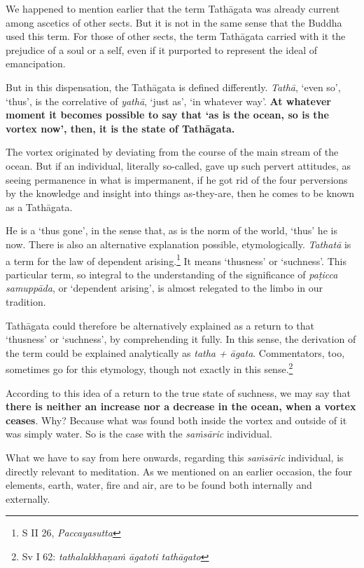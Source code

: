 We happened to mention earlier that the term Tathāgata was already current among ascetics of other sects. But it is not in the same sense that the Buddha used this term. For those of other sects, the term Tathāgata carried with it the prejudice of a soul or a self, even if it purported to represent the ideal of emancipation.

But in this dispensation, the Tathāgata is defined differently. \emph{Tathā}, `even so', `thus', is the correlative of \emph{yathā}, `just as', `in whatever way'. \textbf{At whatever moment it becomes possible to say that `as is the ocean, so is the vortex now', then, it is the state of Tathāgata.}

The vortex originated by deviating from the course of the main stream of the ocean. But if an individual, literally so-called, gave up such pervert attitudes, as seeing permanence in what is impermanent, if he got rid of the four perversions by the knowledge and insight into things as-they-are, then he comes to be known as a Tathāgata.

He is a `thus gone', in the sense that, as is the norm of the world, `thus' he is now. There is also an alternative explanation possible, etymologically. \emph{Tathatā} is a term for the law of dependent arising.\footnote{S II 26, \emph{Paccayasutta}} It means `thusness' or `suchness'. This particular term, so integral to the understanding of the significance of \emph{paṭicca samuppāda}, or `dependent arising', is almost relegated to the limbo in our tradition.

Tathāgata could therefore be alternatively explained as a return to that `thusness' or `suchness', by comprehending it fully. In this sense, the derivation of the term could be explained analytically as \emph{tatha + āgata}. Commentators, too, sometimes go for this etymology, though not exactly in this sense.\footnote{Sv I 62: \emph{tathalakkhaṇaṁ āgatoti tathāgato}}

According to this idea of a return to the true state of suchness, we may say that \textbf{there is neither an increase nor a decrease in the ocean, when a vortex ceases}. Why? Because what was found both inside the vortex and outside of it was simply water. So is the case with the \emph{saṁsāric} individual.

What we have to say from here onwards, regarding this \emph{saṁsāric} individual, is directly relevant to meditation. As we mentioned on an earlier occasion, the four elements, earth, water, fire and air, are to be found both internally and externally.

